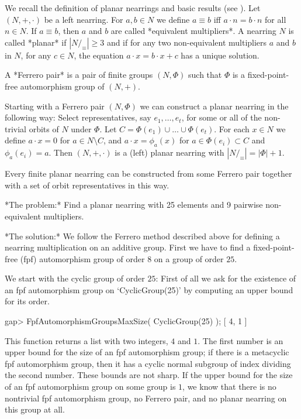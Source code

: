 %
%

We recall the definition of planar nearrings and basic results 
(see \cite{Clay:Nearrings}).
Let $(N,+,\cdot)$ be a left nearring. For $a,b \in N$ we define $a \equiv b$
iff $a\cdot n = b\cdot n$ for all $n\in N$. If $a \equiv b$, then $a$ and $b$
are called *equivalent multipliers*.
A nearring $N$ is called *planar* if $| N/_{\equiv} | \ge 3$ and if 
for any two non-equivalent multipliers $a$ and $b$ in $N$, for any $c\in N$, 
the equation $a\cdot x = b\cdot x + c$ has a unique solution. 

A *Ferrero pair* is a pair of finite groups $(N,\Phi)$ such that $\Phi$
is a fixed-point-free automorphism group of $(N,+)$.   

Starting with a Ferrero pair $(N,\Phi)$ we can construct a planar nearring
in the following way:
Select representatives, say $e_{1},\ldots,e_{t}$, for some or all of the
non-trivial orbits of $N$ under $\Phi$. 
Let $C = \Phi(e_1)\cup\ldots\cup\Phi(e_t)$.
For each $x\in N$ we define $a\cdot x = 0$ for $a\in N\setminus C$, and 
$a\cdot x=\phi_{a}(x)$ for $a\in\Phi(e_{i})\subset C$ and $\phi_{a}(e_{i})=a$.
Then $(N,+,\cdot)$ is a (left) planar nearring with $|N/_{\equiv}| = |\Phi|+1$.

Every finite planar nearring can be constructed from some Ferrero pair 
together with a set of orbit representatives in this way.

*The problem:* Find a planar nearring with 25 elements and 9 pairwise
non-equivalent multipliers.

*The solution:* We follow the Ferrero method described above for defining a
nearring multiplication on an additive group. 
First we have to find a fixed-point-free (fpf) automorphism group of
order $8$ on a group of order $25$. %

We start with the cyclic group of order $25$:
First of all we ask for the existence of an fpf automorphism group
on `CyclicGroup(25)' by computing an upper bound for its order.

\beginexample 
    gap> FpfAutomorphismGroupsMaxSize( CyclicGroup(25) );
    [ 4, 1 ]
\endexample

This function returns a list with two integers, $4$ and $1$. 
The first number is an upper bound for the size of an fpf automorphism group;
if there is a metacyclic fpf automorphism group, then it has a cyclic normal
subgroup of index dividing the second number. These bounds are not sharp.
%
If the upper bound for the size of an fpf automorphism group on some group
is $1$, we know that there is no nontrivial fpf automorphism group, no 
Ferrero pair, and no planar nearring on this group at all.

